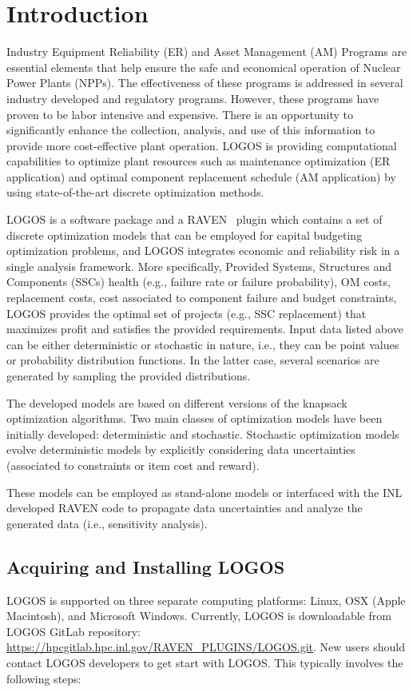 \section{Introduction}
\label{sec:Introduction}

Industry Equipment Reliability (ER) and Asset Management (AM) Programs are essential elements that
help ensure the safe and economical operation of Nuclear Power Plants (NPPs). The effectiveness of
these programs is addressed in several industry developed and regulatory programs. However, these
programs have proven to be labor intensive and expensive. There is an opportunity to significantly
enhance the collection, analysis, and use of this information to provide more cost-effective plant
operation. LOGOS is providing computational capabilities to optimize plant resources such as
maintenance optimization (ER application) and optimal component replacement schedule (AM application)
by using state-of-the-art discrete optimization methods.

LOGOS is a software package and a RAVEN~\cite{RAVEN,RAVENtheoryMan} plugin which
contains a set of discrete optimization models that can be
employed for capital budgeting optimization problems, and LOGOS integrates economic and reliability
risk in a single analysis framework. More specifically,  Provided Systems, Structures and Components
(SSCs) health (e.g., failure rate or failure probability), OM costs, replacement costs, cost
associated to component failure and budget constraints, LOGOS provides the optimal set of projects
(e.g., SSC replacement) that maximizes profit and satisfies the provided requirements. Input data
listed above can be either deterministic or stochastic in nature, i.e., they can be point values
or probability distribution functions. In the latter case, several scenarios are generated by
sampling the provided distributions.

The developed models are based on different versions of the knapsack optimization algorithms.
Two main classes of optimization models have been initially developed: deterministic and stochastic.
Stochastic optimization models evolve deterministic models by explicitly considering data
uncertainties (associated to constraints or item cost and reward).

These models can be employed as stand-alone models or interfaced with the INL developed RAVEN code
to propagate data uncertainties and analyze the generated data (i.e., sensitivity analysis).

\subsection{Acquiring and Installing LOGOS}
LOGOS is supported on three separate computing platforms: Linux, OSX (Apple Macintosh), and Microsoft
Windows. Currently, LOGOS is downloadable from LOGOS GitLab repository:
\url{https://hpcgitlab.hpc.inl.gov/RAVEN_PLUGINS/LOGOS.git}. New users should contact LOGOS developers to
get start with LOGOS. This typically involves the following steps:

